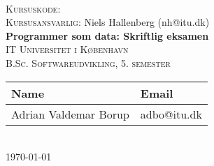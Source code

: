 \newcommand{\HRule}{\rule{1\linewidth}{0.5mm}}
\center
\ \\[4cm]
\hbox{}
\vspace{0.5cm}
\textsc{\large Kursuskode: }
\\[0.2cm]
{\large \textsc{Kursusansvarlig:} Niels Hallenberg (nh@itu.dk)}
\\[1cm]
\hbox{\makebox[1\textwidth][c]{\HRule}}
\vspace{0.8cm}
{ \huge \bfseries Programmer som data: Skriftlig eksamen}
\\[0.6cm]
\hbox{\makebox[1\textwidth][c]{\HRule}}
\vspace{0.9cm}
\textsc{\large IT Universitet i København}
\\[0.2cm]
\textsc{\large B.Sc. Softwareudvikling, 5. semester}
\\[1.5cm]
\begin{tabular}{ll}
\toprule
\textbf{Name} & \textbf{Email} \\
\midrule
Adrian Valdemar Borup & adbo@itu.dk \\
\bottomrule
\end{tabular}
\\[2cm]
{\large \today}
\\[2cm]
\vfill